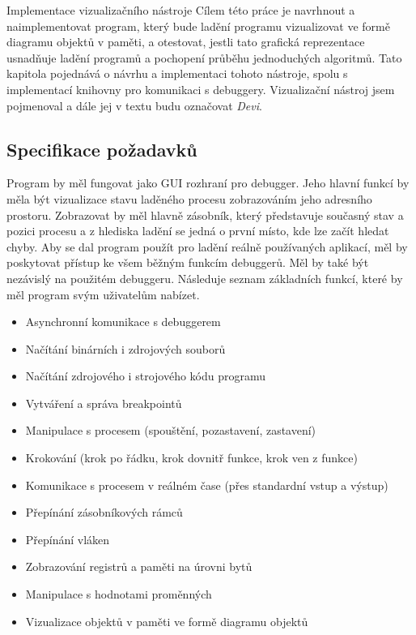 \documentclass[czech,bachelor,male,python,dept460]{diploma}						%
\begin{document}
\begin{section}{Implementace vizualizačního nástroje}
\label{sec:DeviImplementation}
  Cílem této práce je navrhnout a naimplementovat program, který bude ladění programu vizualizovat ve formě diagramu objektů v paměti, a otestovat,
	jestli tato grafická reprezentace usnadňuje ladění programů a pochopení průběhu jednoduchých algoritmů.
	Tato kapitola pojednává o návrhu a implementaci tohoto nástroje, spolu s implementací knihovny pro komunikaci s debuggery.
	Vizualizační nástroj jsem pojmenoval a dále jej v textu budu označovat \textit{Devi}.
	
	\subsection{Specifikace požadavků}
	Program by měl fungovat jako GUI rozhraní pro debugger. Jeho hlavní funkcí by měla být vizualizace stavu laděného procesu zobrazováním jeho
	adresního prostoru. Zobrazovat by měl hlavně zásobník, který představuje současný stav a pozici procesu a z hlediska ladění se jedná o první místo,
	kde lze začít hledat chyby.
	Aby se dal program použít pro ladění reálně používaných aplikací, měl by poskytovat přístup ke všem běžným
	funkcím debuggerů. Měl by také být nezávislý na použitém debuggeru. Následuje seznam základních funkcí, které by měl program svým uživatelům nabízet.
	
	\begin{itemize}
		\item Asynchronní komunikace s debuggerem
		\item Načítání binárních i zdrojových souborů
		\item Načítání zdrojového i strojového kódu programu
		\item Vytváření a správa breakpointů
		\item Manipulace s procesem (spouštění, pozastavení, zastavení)
		\item Krokování (krok po řádku, krok dovnitř funkce, krok ven z funkce)
		\item Komunikace s procesem v reálném čase (přes standardní vstup a výstup)
		\item Přepínání zásobníkových rámců
		\item Přepínání vláken
		\item Zobrazování registrů a paměti na úrovni bytů
		\item Manipulace s hodnotami proměnných
		\item Vizualizace objektů v paměti ve formě diagramu objektů
	\end{itemize}
	

\end{section}
\end{document}
